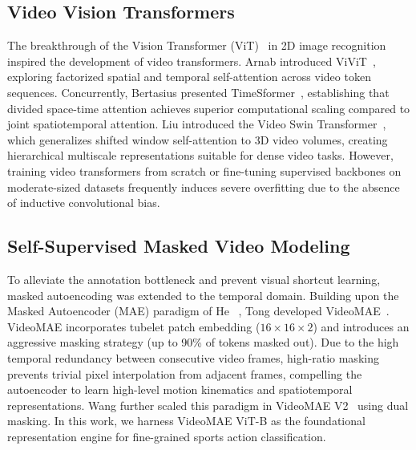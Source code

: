 \subsection{Video Vision Transformers}
The breakthrough of the Vision Transformer (ViT)~\cite{dosovitskiy2020vit} in 2D image recognition inspired the development of video transformers. Arnab \etal{} introduced ViViT~\cite{arnab2021vivit}, exploring factorized spatial and temporal self-attention across video token sequences. Concurrently, Bertasius \etal{} presented TimeSformer~\cite{bertasius2021timesformer}, establishing that divided space-time attention achieves superior computational scaling compared to joint spatiotemporal attention. Liu \etal{} introduced the Video Swin Transformer~\cite{liu2022videoswin}, which generalizes shifted window self-attention to 3D video volumes, creating hierarchical multiscale representations suitable for dense video tasks. However, training video transformers from scratch or fine-tuning supervised backbones on moderate-sized datasets frequently induces severe overfitting due to the absence of inductive convolutional bias.

\subsection{Self-Supervised Masked Video Modeling}
To alleviate the annotation bottleneck and prevent visual shortcut learning, masked autoencoding was extended to the temporal domain. Building upon the Masked Autoencoder (MAE) paradigm of He \etal{}~\cite{he2022masked}, Tong \etal{} developed VideoMAE~\cite{tong2022videomae}. VideoMAE incorporates tubelet patch embedding ($16 \times 16 \times 2$) and introduces an aggressive masking strategy (up to 90\% of tokens masked out). Due to the high temporal redundancy between consecutive video frames, high-ratio masking prevents trivial pixel interpolation from adjacent frames, compelling the autoencoder to learn high-level motion kinematics and spatiotemporal representations. Wang \etal{} further scaled this paradigm in VideoMAE V2~\cite{wang2023videomaev2} using dual masking. In this work, we harness VideoMAE ViT-B as the foundational representation engine for fine-grained sports action classification.
